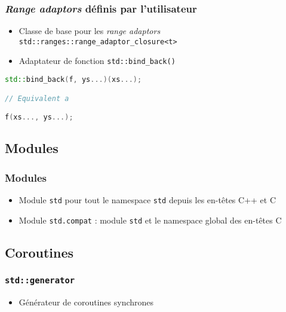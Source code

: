 \documentclass[C++.tex]{subfiles}
\begin{document}
\begin{frame}[fragile]
	\frametitle{\textit{Range adaptors} définis par l'utilisateur}
	\begin{itemize}
		\item Classe de base pour les \textit{range adaptors} \lstinline|std::ranges::range_adaptor_closure<t>|
		\item Adaptateur de fonction \lstinline|std::bind_back()|
	\end{itemize}

	\begin{lstlisting}[language=C++]
std::bind_back(f, ys...)(xs...);

// Equivalent a

f(xs..., ys...);\end{lstlisting}
\end{frame}

\subsection*{Modules}
\begin{frame}[fragile]
	\frametitle{Modules}
	\begin{itemize}
		\item Module \lstinline|std| pour tout le namespace \lstinline|std| depuis les en-têtes C++ et C
		\item Module \lstinline|std.compat| : module \lstinline|std| et le namespace global des en-têtes C
	\end{itemize}
\end{frame}

\subsection*{Coroutines}
\begin{frame}[fragile]
	\frametitle{\lstinline|std::generator|}
	\begin{itemize}
		\item Générateur de coroutines synchrones
	\end{itemize}
\end{frame}
\end{document}
